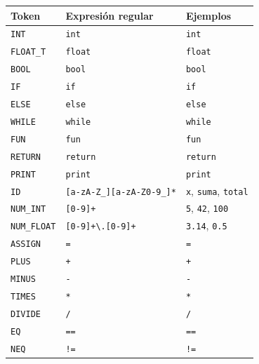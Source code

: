 \documentclass[12pt]{article}
\begin{document}
\begin{table}[H]
\centering
\small
\renewcommand{\arraystretch}{1.1}
\begin{tabular}{@{}p{2.5cm} p{4.5cm} p{4.5cm}@{}}
\toprule
\textbf{Token} & \textbf{Expresión regular} & \textbf{Ejemplos} \\
\midrule
\texttt{INT}        & \texttt{int}                          & \texttt{int} \\
\texttt{FLOAT\_T}   & \texttt{float}                        & \texttt{float} \\
\texttt{BOOL}       & \texttt{bool}                         & \texttt{bool} \\
\texttt{IF}         & \texttt{if}                           & \texttt{if} \\
\texttt{ELSE}       & \texttt{else}                         & \texttt{else} \\
\texttt{WHILE}      & \texttt{while}                        & \texttt{while} \\
\texttt{FUN}        & \texttt{fun}                          & \texttt{fun} \\
\texttt{RETURN}     & \texttt{return}                       & \texttt{return} \\
\texttt{PRINT}      & \texttt{print}                        & \texttt{print} \\
\texttt{ID}         & \texttt{[a-zA-Z\_][a-zA-Z0-9\_]*}    & \texttt{x}, \texttt{suma}, \texttt{total} \\
\texttt{NUM\_INT}   & \texttt{[0-9]+}                       & \texttt{5}, \texttt{42}, \texttt{100} \\
\texttt{NUM\_FLOAT} & \texttt{[0-9]+\textbackslash.[0-9]+} & \texttt{3.14}, \texttt{0.5} \\
\texttt{ASSIGN}     & \texttt{=}                            & \texttt{=} \\
\texttt{PLUS}       & \texttt{+}                            & \texttt{+} \\
\texttt{MINUS}      & \texttt{-}                            & \texttt{-} \\
\texttt{TIMES}      & \texttt{*}                            & \texttt{*} \\
\texttt{DIVIDE}     & \texttt{/}                            & \texttt{/} \\
\texttt{EQ}         & \texttt{==}                           & \texttt{==} \\
\texttt{NEQ}        & \texttt{!=}                           & \texttt{!=} \\

\end{tabular}
\end{table}
\end{document}
